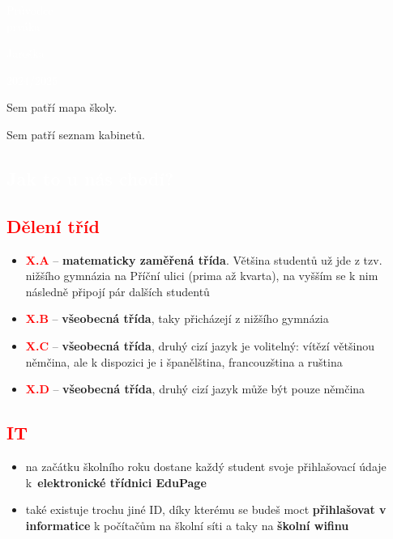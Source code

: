 \documentclass{article}
\newcommand{\nadpis}[1]{
  \begin{nadpisbox}
    \centering \section*{\textcolor{white}{#1}}
  \end{nadpisbox}
}
\newcommand{\podnadpis}[1]{
  \subsection*{\textcolor{red}{#1}}
}
\begin{document}
\begin{titlepage}
  \pagecolor{red}
    \begin{center}
      \vspace*{\fill}

      \textcolor{white}{\fontsize{60}{60} \Kapitan Průvodce\\\vspace{0.2em}prváka}

      \vspace*{\fill}
      \textcolor{white}{\fontsize{20}{20} \Kapitan Jaroška}

      \vspace{0.5em}

      \begin{bluebox}
        \centering \fontsize{15}{15} \Kapitan \textcolor{white}{2024/2025}
      \end{bluebox}

      \vspace{3em}

    \end{center}
\end{titlepage}
\pagecolor{white}


Sem patří mapa školy.
\newpage

Sem patří seznam kabinetů.
\newpage

\nadpis{Jak to u nás chodí?}
\noindent \podnadpis{Dělení tříd}
\begin{itemize}[leftmargin=10pt]
  \item \textcolor{red}{\textbf{X.A}} --  \textbf{matematicky zaměřená třída}. Většina studentů už jde z tzv. nižšího gymnázia na Příční ulici (prima až kvarta), na vyšším se k nim následně připojí pár dalších studentů
  \item \textcolor{red}{\textbf{X.B}} -- \textbf{všeobecná třída}, taky přicházejí z nižšího gymnázia
  \item \textcolor{red}{\textbf{X.C}} -- \textbf{všeobecná třída}, druhý cizí jazyk je volitelný: vítězí většinou němčina, ale
k dispozici je i španělština, francouzština a ruština
  \item \textcolor{red}{\textbf{X.D}} -- \textbf{všeobecná třída}, druhý cizí jazyk může být pouze němčina
\end{itemize}
\podnadpis{IT}
\begin{itemize}[leftmargin=10pt]
  \item na začátku školního roku dostane každý student svoje přihlašovací údaje k~\textbf{elektronické třídnici EduPage}
  \item také existuje trochu jiné ID, díky kterému se budeš moct \textbf{přihlašovat v informatice} k počítačům na školní síti a taky na \textbf{školní wifinu}
\end{itemize}
\end{document}

